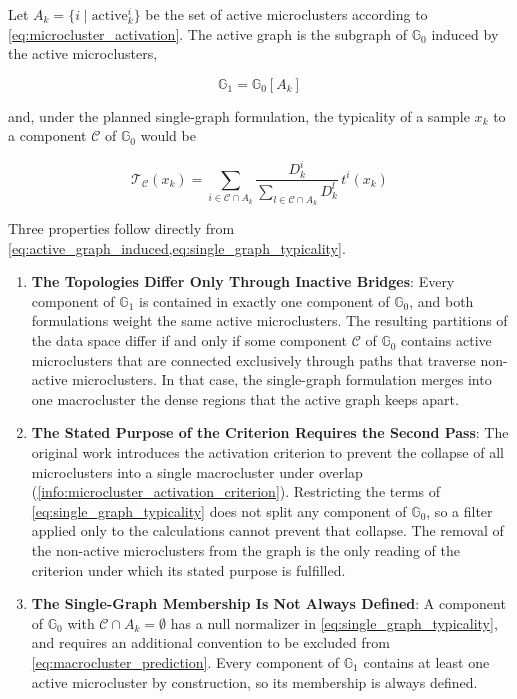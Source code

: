 Let $A_k = \{i \mid \text{active}_k^i\}$ be the set of active microclusters according to \cref{eq:microcluster_activation}. The active graph is the subgraph of $\mathbb{G}_0$ induced by the active microclusters,

\begin{equation}
    \mathbb{G}_1 = \mathbb{G}_0\left[A_k\right]
    \label{eq:active_graph_induced}
\end{equation}

and, under the planned single-graph formulation, the typicality of a sample $x_k$ to a component $\mathcal{C}$ of $\mathbb{G}_0$ would be

\begin{equation}
    \mathcal{T}_{\mathcal{C}}(x_k) = \sum_{i \in \mathcal{C} \cap A_k} \frac{D^i_k}{\sum_{l \in \mathcal{C} \cap A_k} D^l_k} \, t^i(x_k)
    \label{eq:single_graph_typicality}
\end{equation}

Three properties follow directly from \cref{eq:active_graph_induced,eq:single_graph_typicality}.

\begin{enumerate}
    \item \textbf{The Topologies Differ Only Through Inactive Bridges}: Every component of $\mathbb{G}_1$ is contained in exactly one component of $\mathbb{G}_0$, and both formulations weight the same active microclusters. The resulting partitions of the data space differ if and only if some component $\mathcal{C}$ of $\mathbb{G}_0$ contains active microclusters that are connected exclusively through paths that traverse non-active microclusters. In that case, the single-graph formulation merges into one macrocluster the dense regions that the active graph keeps apart.
    \item \textbf{The Stated Purpose of the Criterion Requires the Second Pass}: The original work introduces the activation criterion to prevent the collapse of all microclusters into a single macrocluster under overlap (\cref{info:microcluster_activation_criterion}). Restricting the terms of \cref{eq:single_graph_typicality} does not split any component of $\mathbb{G}_0$, so a filter applied only to the calculations cannot prevent that collapse. The removal of the non-active microclusters from the graph is the only reading of the criterion under which its stated purpose is fulfilled.
    \item \textbf{The Single-Graph Membership Is Not Always Defined}: A component of $\mathbb{G}_0$ with $\mathcal{C} \cap A_k = \emptyset$ has a null normalizer in \cref{eq:single_graph_typicality}, and requires an additional convention to be excluded from \cref{eq:macrocluster_prediction}. Every component of $\mathbb{G}_1$ contains at least one active microcluster by construction, so its membership is always defined.
\end{enumerate}

